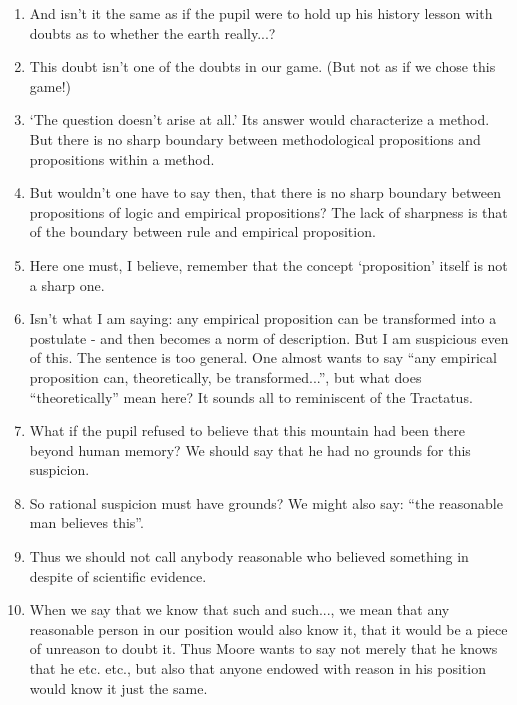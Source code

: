 \documentclass{book}
\begin{document}
\begin{enumerate}
\item
And isn't it the same as if the pupil were to hold up his history lesson with
doubts as to whether the earth really...?

\item
This doubt isn't one of the doubts in our game. (But not as if we chose this
game!)

\item
`The question doesn't arise at all.' Its answer would characterize a method.
But there is no sharp boundary between methodological propositions and
propositions within a method.

\item
But wouldn't one have to say then, that there is no sharp boundary between
propositions of logic and empirical propositions? The lack of sharpness is that
of the boundary between rule and empirical proposition.

\item
Here one must, I believe, remember that the concept `proposition' itself is not
a sharp one.

\item
Isn't what I am saying: any empirical proposition can be transformed into a
postulate - and then becomes a norm of description. But I am suspicious even of
this. The sentence is too general. One almost wants to say ``any empirical
proposition can, theoretically, be transformed...'', but what does
``theoretically'' mean here? It sounds all to reminiscent of the Tractatus.

\item
What if the pupil refused to believe that this mountain had been there beyond
human memory?  We should say that he had no grounds for this suspicion.

\item
So rational suspicion must have grounds?  We might also say: ``the reasonable
man believes this''.

\item
Thus we should not call anybody reasonable who believed something in despite of
scientific evidence.

\item
When we say that we know that such and such..., we mean that any reasonable
person in our position would also know it, that it would be a piece of unreason
to doubt it. Thus Moore wants to say not merely that he knows that he etc.
etc., but also that anyone endowed with reason in his position would know it
just the same.


\end{enumerate}
\end{document}

